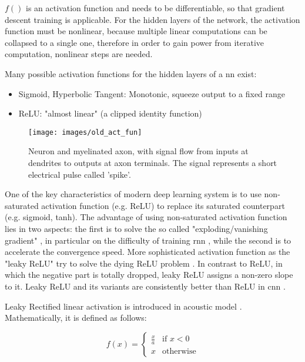 \noindent $f()$ is an activation function and needs to be differentiable, so that gradient descent training is applicable. For the hidden layers of the network, the activation function must be nonlinear, because multiple linear computations can be collapsed to a single one, therefore in order to gain power from iterative computation, nonlinear steps are needed.

\noindent Many possible activation functions for the hidden layers of a \gls{nn} exist:
\begin{itemize}
	\item Sigmoid, Hyperbolic Tangent: Monotonic, squeeze output to a fixed range
	\item ReLU: "almost linear" (a clipped identity function)
\end{itemize}

\begin{figure}[H]
	\centering
	\texttt{[image: images/old\_act\_fun]}
	\caption[Image of a human neuron.]{Neuron and myelinated axon, with signal flow from inputs at dendrites to outputs at axon terminals. The signal represents a short electrical pulse called 'spike'.}
	\label{fig:old_act_fun}
\end{figure}

\noindent One of the key characteristics of modern deep learning system is to use non-saturated activation function (e.g. ReLU) to replace its saturated counterpart (e.g. sigmoid, tanh). The advantage of using non-saturated activation function lies in two aspects: the first is to solve the so called "exploding/vanishing gradient" \cite[]{bengio1994learning}, in particular on the difficulty of training \gls{rnn} \cite[]{pascanu2013difficulty}, while the second is to accelerate the convergence speed. More sophisticated activation function as the "leaky ReLU" try to solve the dying ReLU problem \cite[]{LeakyReL95:online}. In contrast to ReLU, in which the negative part is totally dropped, leaky ReLU assigns a non-zero slope to it. Leaky ReLU and its variants are consistently better than ReLU in \gls{cnn} \cite[]{xu2015empirical}.

\noindent Leaky Rectified linear activation is introduced in acoustic model \cite[]{maas2013rectifier}. Mathematically, it is defined as follows:

\begin{Equation}[H]
	\centering
	\begin{equation} \label{eq:leakyrelu}
 		f(x) = 
			\begin{cases}
			\frac{x}{a} & \text{if $x < 0 $} \\
			x & \text{otherwise}
		\end{cases}
	\end{equation}
	\caption[Leaky Rectified linear activation.]{Function that identifies input transformation at each step $l$ of the net.}
\end{Equation}

